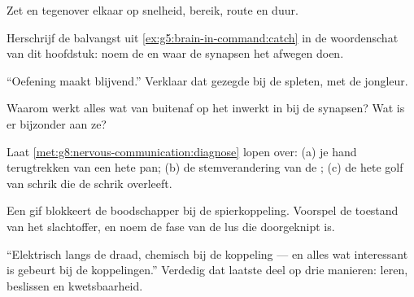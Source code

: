 \begin{exercise}[$\star$]\label{exo:g8:nervous-communication:6}
Zet  en  tegenover elkaar op snelheid, bereik, route en
duur.
\end{exercise}

\begin{exercise}[$\star\star$]\label{exo:g8:nervous-communication:7}
Herschrijf de balvangst uit \cref{ex:g5:brain-in-command:catch} in de
woordenschat van dit hoofdstuk: noem de   en waar de
synapsen het afwegen doen.
\end{exercise}

\begin{exercise}[$\star\star$]\label{exo:g8:nervous-communication:8}
``Oefening maakt blijvend.'' Verklaar dat gezegde bij de spleten, met de
jongleur.
\end{exercise}

\begin{exercise}[$\star\star$]\label{exo:g8:nervous-communication:9}
Waarom werkt alles wat van buitenaf op het  inwerkt in bij de
synapsen? Wat is er bijzonder aan ze?
\end{exercise}

\begin{exercise}[$\star\star$]\label{exo:g8:nervous-communication:10}
Laat \cref{met:g8:nervous-communication:diagnose} lopen over: (a) je hand
terugtrekken van een hete pan; (b) de stemverandering van de ;
(c) de hete golf van schrik die de schrik overleeft.
\end{exercise}

\begin{exercise}[$\star\star$]\label{exo:g8:nervous-communication:11}
Een gif blokkeert de boodschapper bij de spierkoppeling. Voorspel de
toestand van het slachtoffer, en noem de fase van de lus die doorgeknipt is.
\end{exercise}

\begin{exercise}[$\star\star\star$]\label{exo:g8:nervous-communication:12}
``Elektrisch langs de draad, chemisch bij de koppeling --- en alles wat
interessant is gebeurt bij de koppelingen.'' Verdedig dat laatste deel op
drie manieren: leren, beslissen en kwetsbaarheid.
\end{exercise}

